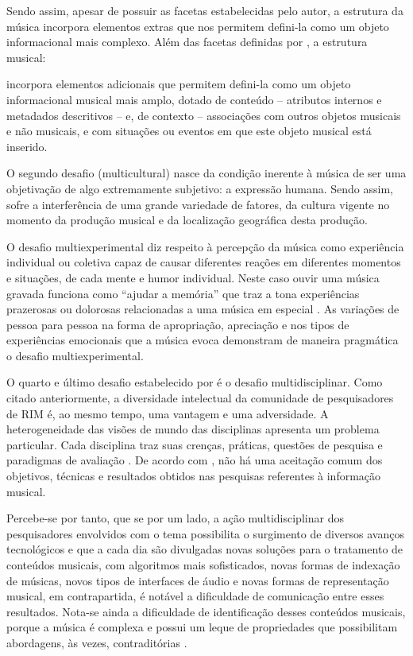 Sendo assim, apesar de possuir as facetas estabelecidas pelo autor, a estrutura da música incorpora elementos extras que nos permitem defini-la como um objeto informacional mais complexo. Além das facetas definidas por , a estrutura musical:

\begin{citacao}
    [...] incorpora elementos adicionais que permitem defini-la como um objeto informacional musical mais amplo, dotado de conteúdo – atributos internos e metadados descritivos – e, de contexto – associações com outros objetos musicais e não musicais, e com situações ou eventos em que este objeto musical está inserido.
\end{citacao}

O segundo desafio (multicultural) nasce da condição inerente à música de ser uma objetivação de algo extremamente subjetivo: a expressão humana. Sendo assim, sofre a interferência de uma grande variedade de fatores, da cultura vigente no momento da produção musical e da localização geográfica desta produção.

O desafio multiexperimental diz respeito à percepção da música como experiência individual ou coletiva capaz de causar diferentes reações em diferentes momentos e situações, de cada mente e humor individual. Neste caso ouvir uma música gravada funciona como “ajudar a memória” que traz a tona experiências prazerosas ou dolorosas relacionadas a uma música em especial \cite{downie2003,santini&souza2007}. As variações de pessoa para pessoa na forma de apropriação, apreciação e nos tipos de experiências emocionais que a música evoca demonstram de maneira pragmática o desafio multiexperimental.

O quarto e último desafio estabelecido por  é o desafio multidisciplinar. Como citado anteriormente, a diversidade intelectual da comunidade de pesquisadores de RIM é, ao mesmo tempo, uma vantagem e uma adversidade. A heterogeneidade das visões de mundo das disciplinas apresenta um problema particular. Cada disciplina traz suas crenças, práticas, questões de pesquisa e paradigmas de avaliação \cite{downie2003}. De acordo com , não há uma aceitação comum dos objetivos, técnicas e resultados obtidos nas pesquisas referentes à informação musical.

Percebe-se por tanto, que se por um lado, a ação multidisciplinar dos pesquisadores envolvidos com o tema possibilita o surgimento de diversos avanços tecnológicos e que a cada dia são divulgadas novas soluções para o tratamento de conteúdos musicais, com algoritmos mais sofisticados, novas formas de indexação de músicas, novos tipos de interfaces de áudio e novas formas de representação musical, em contrapartida, é notável a dificuldade de comunicação entre esses resultados. Nota-se ainda a dificuldade de identificação desses conteúdos musicais, porque a música é complexa e possui um leque de propriedades que possibilitam abordagens, às vezes, contraditórias \cite{cruz2014}.

